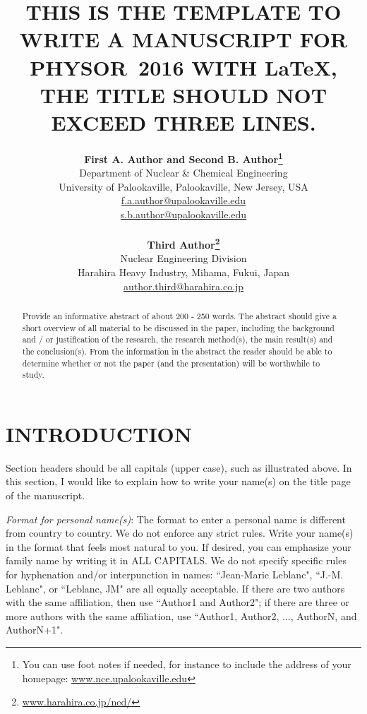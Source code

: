 \documentclass[12pt]{article}
\title{THIS IS THE TEMPLATE TO WRITE A MANUSCRIPT FOR PHYSOR~2016 WITH \LaTeX, THE TITLE SHOULD NOT EXCEED THREE LINES.}
\author{ 
  \textbf{First A. Author and Second B. Author\footnote{You can use foot notes if needed, for instance to include the address of your homepage: \href{http://www.nce.upalookaville.edu/}{www.nce.upalookaville.edu}}} \\
  Department of Nuclear \& Chemical Engineering \\
  University of Palookaville, Palookaville, New Jersey, USA\\
  \href{mailto:f.a.author@upalookaville.edu}{f.a.author@upalookaville.edu}\\
  \href{mailto:s.b.author@upalookaville.edu}{s.b.author@upalookaville.edu}\\
  \\                       %
  \textbf{Third Author\footnote{\href{http://www.harahira.co.jp/ned/}{www.harahira.co.jp/ned/}}} \\
  Nuclear Engineering Division \\
  Harahira Heavy Industry, Mihama, Fukui, Japan\\
  \href{mailto:author.third@harahira.co.jp}{author.third@harahira.co.jp}
}
\begin{document}


\maketitle

\begin{abstract}
  Provide an informative abstract of about 200 - 250 words. The abstract should give a short overview of all material to be discussed in the paper, including the background and / or justification of the research, the research method(s), the main result(s) and the conclusion(s). From the information in the abstract the reader should be able to determine whether or not the paper (and the presentation) will be worthwhile to study.
\end{abstract}


%
\section{INTRODUCTION}
\label{sect::intro}

Section headers should be all capitals (upper case), such as illustrated above. In this section, I would like to explain how to write your name(s) on the title page of the manuscript. 

\emph{Format for personal name(s)}: The format to enter a personal name is different from country to country. We do not enforce any strict rules. Write your name(s) in the format that feels most natural to you. If desired, you can emphasize your family name by writing it in ALL CAPITALS. We do not specify specific rules for hyphenation and/or interpunction in names: ``Jean-Marie Leblanc", ``J.-M. Leblanc", or ``Leblanc, JM" are all equally acceptable. If there are two authors with the same affiliation, then use ``Author1 and Author2"; if there are three or more authors with the same affiliation, use ``Author1, Author2, ..., AuthorN, and AuthorN+1".
\end{document}
